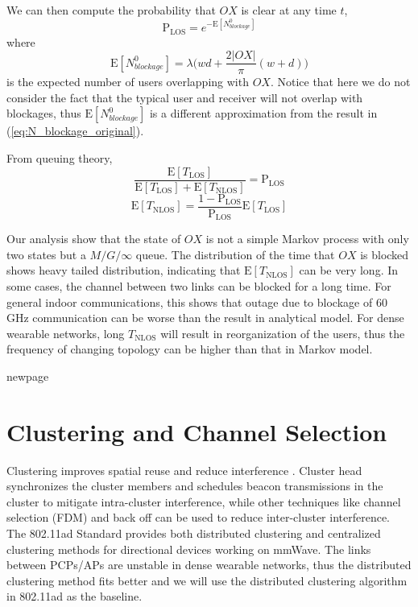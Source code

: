 \documentclass[10pt, conference, letterpaper]{IEEEtran}
\begin{document}
We can then compute the probability that $OX$ is clear at any time $t$, 
\begin{equation}
\mathrm{P}_{\mathrm{LOS}} = e^{-\mathrm{E}[N_{blockage}^0]}
\end{equation}
where 
\begin{equation*}
\mathrm{E}[N_{blockage}^0] = \lambda\big(wd+\frac{2|OX|}{\pi}(w+d)\big)
\end{equation*} 
is the expected number of users overlapping with $OX$. Notice that here we do not consider the fact that the typical user and receiver will not overlap with blockages, thus $\mathrm{E}[N_{blockage}^0]$ is a different approximation from the result in (\ref{eq:N_blockage_original}).

From queuing theory, 
\begin{equation}
\frac{\mathrm{E}[T_{\mathrm{LOS}}]}{\mathrm{E}[T_{\mathrm{LOS}}] + \mathrm{E}[T_{\mathrm{NLOS}}]} = \mathrm{P}_{\mathrm{LOS}}
\end{equation}
\begin{equation}
\mathrm{E}[T_{\mathrm{NLOS}}] = \frac{1-\mathrm{P}_{\mathrm{LOS}}}{ \mathrm{P}_{\mathrm{LOS}}}\mathrm{E}[T_{\mathrm{LOS}}]
\end{equation}

Our analysis show that the state of $OX$ is not a simple Markov process with only two states but a $M/G/\infty$ queue. The distribution of the time that $OX$ is blocked shows heavy tailed distribution, indicating that $\mathrm{E}[T_{\mathrm{NLOS}}]$ can be very long. In some cases, the channel between two links can be blocked for a long time. For general indoor communications, this shows that outage due to blockage of 60 GHz communication can be worse than the result in analytical model. For dense wearable networks, long $T_{\mathrm{NLOS}}$ will result in reorganization of the users, thus the frequency of changing topology can be higher than that in Markov model.





\newpage
newpage
\newpage

\section{Clustering and Channel Selection}
Clustering improves spatial reuse and reduce interference \cite{80211ad}. Cluster head synchronizes the cluster members and schedules beacon transmissions in the cluster to mitigate intra-cluster interference, while other techniques like channel selection (FDM) and back off \cite{backoff} can be used to reduce inter-cluster interference. The 802.11ad Standard provides both distributed clustering and centralized clustering methods for directional devices working on mmWave. The links between PCPs/APs are unstable in dense wearable networks, thus the distributed clustering method fits better and we will use the distributed clustering algorithm in 802.11ad as the baseline.
\end{document}

